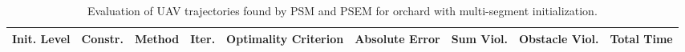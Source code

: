 \begin{table}
\small

\caption{Evaluation of UAV trajectories found by PSM and PSEM for orchard with multi-segment initialization.}
\label{tab:traj-plan-eval-orchard-multi}
\begin{tabular}{p{21mm}p{9mm}p{12mm}p{6mm}p{14mm}p{14mm}p{14mm}p{14mm}p{14mm}}
\toprule
Init. Level & Constr. & Method & Iter. & Optimality Criterion & Absolute Error & Sum Viol. & Obstacle Viol. & Total Time \\
\midrule
\bottomrule
\end{tabular}
\end{table}
